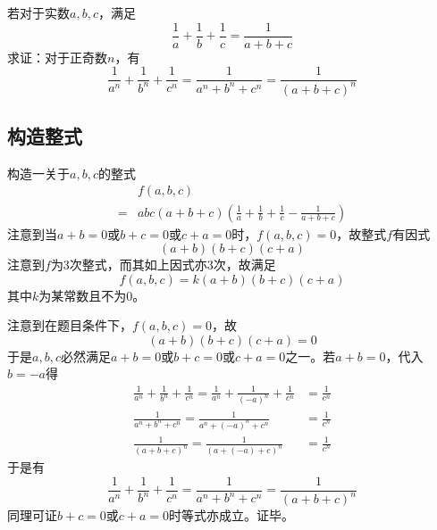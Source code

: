 

若对于实数$a, b, c$，满足
\[ \frac1a + \frac1b + \frac1c = \frac1{a + b + c} \]
求证：对于正奇数$n$，有
\[ \frac1{a^n} + \frac1{b^n} + \frac1{c^n} = \frac1{a^n + b^n + c^n} = \frac1{(a + b + c)^n} \]

\subsection{构造整式}

构造一关于$a, b, c$的整式
\begin{align*}
  & f(a, b, c) \\
  ={}& abc(a + b + c)\left(\frac1a + \frac1b + \frac1c - \frac1{a + b + c}\right)
\end{align*}
注意到当$a + b = 0$或$b + c = 0$或$c + a = 0$时，$f(a, b, c) = 0$，故整式$f$有因式
\[ (a + b)(b + c)(c + a) \]
注意到$f$为3次整式，而其如上因式亦3次，故满足
\[ f(a, b, c) = k(a + b)(b + c)(c + a) \]
其中$k$为某常数且不为0。

注意到在题目条件下，$f(a, b, c) = 0$，故
\[ (a + b)(b + c)(c + a) = 0 \]
于是$a, b, c$必然满足$a + b = 0$或$b + c = 0$或$c + a = 0$之一。若$a + b = 0$，代入$b = -a$得
\begin{align*}
  \frac1{a^n} + \frac1{b^n} + \frac1{c^n} = \frac1{a^n} + \frac1{(-a)^n} + \frac1{c^n} &= \frac1{c^n} \\
  \frac1{a^n + b^n + c^n} = \frac1{a^n + (-a)^n + c^n} &= \frac1{c^n} \\
  \frac1{(a + b + c)^n} = \frac1{(a + (-a) + c)^n} &= \frac1{c^n}
\end{align*}
于是有
\[ \frac1{a^n} + \frac1{b^n} + \frac1{c^n} = \frac1{a^n + b^n + c^n} = \frac1{(a + b + c)^n} \]
同理可证$b + c = 0$或$c + a = 0$时等式亦成立。证毕。
